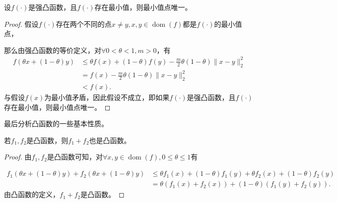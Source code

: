 \begin{theorem}
    设$f(\cdot)$是强凸函数，且$f(\cdot)$存在最小值，则最小值点唯一。
\end{theorem}
\begin{proof}
    假设$f(\cdot)$存在两个不同的点$x\neq y, x, y\in \mathop{\mathrm{dom}} (f)$都是$f(\cdot)$的最小值点，

    那么由强凸函数的等价定义，对$\forall 0<\theta<1, m>0$，有
    \begin{equation*}
        \begin{split}
            f(\theta x + (1-\theta)y) &\leq \theta f(x) + (1-\theta)f(y) - \frac{m}{2}\theta(1-\theta)\|x-y\|_{2}^{2} \\
            &= f(x) - \frac{m}{2}\theta(1-\theta)\|x-y\|_{2}^{2} \\
            &< f(x).
        \end{split}
    \end{equation*}
    与假设$f(x)$为最小值矛盾，因此假设不成立，即如果$f(\cdot)$是强凸函数，且$f(\cdot)$存在最小值，则最小值点唯一。
\end{proof}

最后分析凸函数的一些基本性质。
\begin{theorem}
    若$f_{1}, f_{2}$是凸函数，则$f_{1}+f_{2}$也是凸函数。
\end{theorem}
\begin{proof}
    由$f_{1}, f_{2}$是凸函数可知，对$\forall x, y\in \mathop{\mathrm{dom}} (f), 0\leq \theta \leq 1$有

    \begin{equation*}
        \begin{split}
            f_{1}(\theta x+(1-\theta)y)+f_{2}(\theta x+(1-\theta)y) &\leq \theta f_{1}(x)+(1-\theta)f_{1}(y) + \theta f_{2}(x)+(1-\theta)f_{2}(y) \\
            &=\theta(f_{1}(x)+f_{2}(x)) + (1-\theta)(f_{1}(y)+f_{2}(y)).
        \end{split}
    \end{equation*}
    由凸函数的定义，$f_{1}+f_{2}$是凸函数。
\end{proof}

